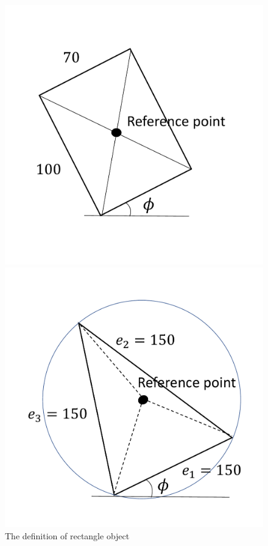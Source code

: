 \documentclass[a4paper,twoside,12pt,papersize, dvipdfmx]{iirthesis}
\begin{document}
\begin{figure}[b]
\centering
\begin{minipage}{0.49\hsize}
\centering
\includegraphics[width=0.9\hsize]{fig/3-new-planner/RectangleDef.pdf}
\caption{The definition of rectangle object}\label{fig::planner::recdef}
\end{minipage}\hfill
\begin{minipage}{0.49\hsize}
\centering
\includegraphics[width=0.9\hsize]{fig/3-new-planner/TriangleDef.pdf}

\end{minipage}
\end{figure}
\end{document}
